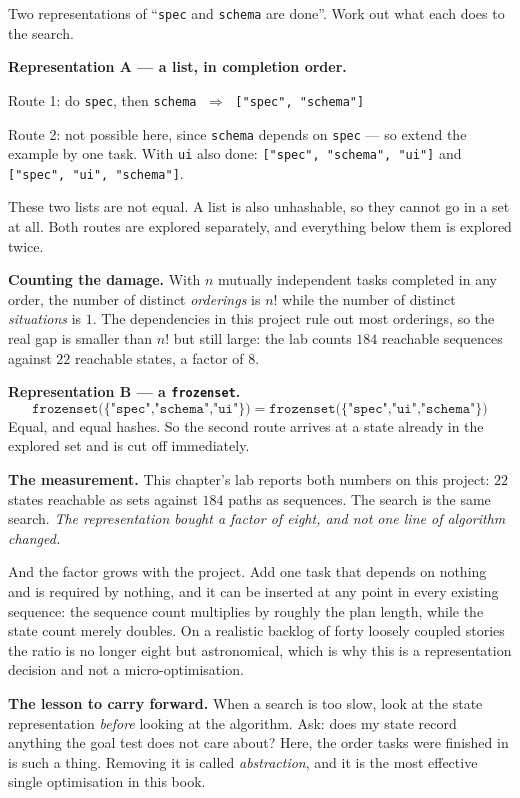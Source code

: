 \begin{worked}
Two representations of ``\texttt{spec} and \texttt{schema} are done''. Work out
what each does to the search.

\smallskip
\textbf{Representation A --- a list, in completion order.}
\begin{tight}
  \item Route 1: do \texttt{spec}, then \texttt{schema} $\;\Rightarrow\;$
        \texttt{["spec", "schema"]}
  \item Route 2: not possible here, since \texttt{schema} depends on \texttt{spec}
        --- so extend the example by one task. With \texttt{ui} also done:
        \texttt{["spec", "schema", "ui"]} and \texttt{["spec", "ui", "schema"]}.
\end{tight}
These two lists are not equal. A list is also unhashable, so they cannot go in a
set at all. Both routes are explored separately, and everything below them is
explored twice.

\smallskip
\textbf{Counting the damage.} With $n$ mutually independent tasks completed in any
order, the number of distinct \emph{orderings} is $n!$ while the number of
distinct \emph{situations} is $1$. The dependencies in this project rule out most
orderings, so the real gap is smaller than $n!$ but still large: the lab counts
$184$ reachable sequences against $22$ reachable states, a factor of $8$.

\smallskip
\textbf{Representation B --- a \texttt{frozenset}.}
\[
  \texttt{frozenset(\{"spec","schema","ui"\})}
  \;=\;
  \texttt{frozenset(\{"spec","ui","schema"\})}
\]
Equal, and equal hashes. So the second route arrives at a state already in the
explored set and is cut off immediately.

\smallskip
\textbf{The measurement.} This chapter's lab reports both numbers on this project:
$22$ states reachable as sets against $184$ paths as sequences. The search is the
same search. \emph{The representation bought a factor of eight, and not one line of
algorithm changed.}

\smallskip
And the factor grows with the project. Add one task that depends on nothing and is
required by nothing, and it can be inserted at any point in every existing
sequence: the sequence count multiplies by roughly the plan length, while the state
count merely doubles. On a realistic backlog of forty loosely coupled stories the
ratio is no longer eight but astronomical, which is why this is a representation
decision and not a micro-optimisation.

\smallskip
\textbf{The lesson to carry forward.} When a search is too slow, look at the state
representation \emph{before} looking at the algorithm. Ask: does my state record
anything the goal test does not care about? Here, the order tasks were finished in
is such a thing. Removing it is called \emph{abstraction}, and it is the most
effective single optimisation in this book.
\end{worked}

